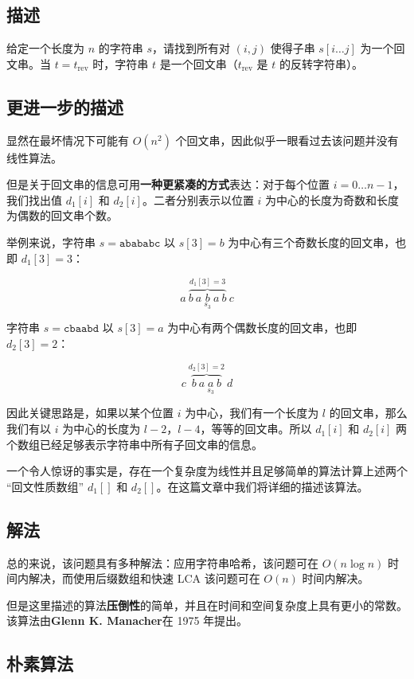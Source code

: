 
\subsection{描述}

给定一个长度为 $n$ 的字符串 $s$，请找到所有对 $(i, j)$ 使得子串 $s[i \dots j]$ 为一个回文串。当 $t = t_{\text{rev}}$ 时，字符串 $t$ 是一个回文串（$t_{\text{rev}}$ 是 $t$ 的反转字符串）。

\subsection{更进一步的描述}

显然在最坏情况下可能有 $O(n^2)$ 个回文串，因此似乎一眼看过去该问题并没有线性算法。

但是关于回文串的信息可用\textbf{一种更紧凑的方式}表达：对于每个位置 $i = 0 \dots n - 1$，我们找出值 $d_1[i]$ 和 $d_2[i]$。二者分别表示以位置 $i$ 为中心的长度为奇数和长度为偶数的回文串个数。

举例来说，字符串 $s = \mathtt{abababc}$ 以 $s[3] = b$ 为中心有三个奇数长度的回文串，也即 $d_1[3] = 3$：

$$
a\ \overbrace{b\ a\ \underset{s_3}{b}\ a\ b}^{d_1[3]=3}\ c
$$

字符串 $s = \mathtt{cbaabd}$ 以 $s[3] = a$ 为中心有两个偶数长度的回文串，也即 $d_2[3] = 2$：

$$
c\ \overbrace{b\ a\ \underset{s_3}{a}\ b}^{d_2[3]=2}\ d
$$

因此关键思路是，如果以某个位置 $i$ 为中心，我们有一个长度为 $l$ 的回文串，那么我们有以 $i$ 为中心的长度为 $l - 2$，$l - 4$，等等的回文串。所以 $d_1[i]$ 和 $d_2[i]$ 两个数组已经足够表示字符串中所有子回文串的信息。

一个令人惊讶的事实是，存在一个复杂度为线性并且足够简单的算法计算上述两个 “回文性质数组” $d_1[]$ 和 $d_2[]$。在这篇文章中我们将详细的描述该算法。

\subsection{解法}

总的来说，该问题具有多种解法：应用字符串哈希，该问题可在 $O(n \log n)$ 时间内解决，而使用后缀数组和快速 LCA 该问题可在 $O(n)$ 时间内解决。

但是这里描述的算法\textbf{压倒性}的简单，并且在时间和空间复杂度上具有更小的常数。该算法由\textbf{Glenn K. Manacher}在 1975 年提出。

\subsection{朴素算法}

